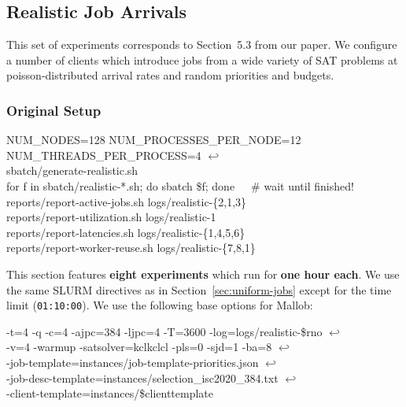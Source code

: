 \documentclass[runningheads]{article}
\newcommand{\CR}{{\tiny$\hookleftarrow$}}
\numberwithin{dummy}{subsection}
\begin{document}
\subsection{Realistic Job Arrivals}

This set of experiments corresponds to Section~5.3 from our paper.
We configure a number of clients which introduce jobs from a wide variety of SAT problems at poisson-distributed arrival rates and random priorities and budgets.

\subsubsection{Original Setup}
\label{sec:realistic-original}

\begin{tcolorbox}[
  colback=Magenta!5!white,
  colframe=Magenta!75!black,
  title={\centering Commands for Original Setup}]
\begin{ttfenvcompact}
NUM\_NODES=128 NUM\_PROCESSES\_PER\_NODE=12 NUM\_THREADS\_PER\_PROCESS=4 \CR\\
\hspace*{0.3cm}sbatch/generate-realistic.sh\\
for f in sbatch/realistic-*.sh; do sbatch \$f; done\ \ \ \# wait until finished!\\
reports/report-active-jobs.sh logs/realistic-\{2,1,3\}\\
reports/report-utilization.sh logs/realistic-1\\
reports/report-latencies.sh logs/realistic-\{1,4,5,6\}\\
reports/report-worker-reuse.sh logs/realistic-\{7,8,1\}
\end{ttfenvcompact}
\end{tcolorbox}

This section features \textbf{eight experiments} which run for \textbf{one hour each}.
We use the same SLURM directives as in Section~\ref{sec:uniform-jobs} except for the time limit (\texttt{01:10:00}).
We use the following base options for Mallob:

\begin{ttfenv}
-t=4 -q -c=4 -ajpc=384 -ljpc=4 -T=3600 -log=logs/realistic-\$rno \CR\\
\hspace*{0.3cm}-v=4 -warmup -satsolver=kclkclcl -pls=0 -sjd=1 -ba=8  \CR\\
\hspace*{0.3cm}-job-template=instances/job-template-priorities.json  \CR\\
\hspace*{0.3cm}-job-desc-template=instances/selection\_isc2020\_384.txt  \CR\\
\hspace*{0.3cm}-client-template=instances/\$clienttemplate
\end{ttfenv}
\end{document}
